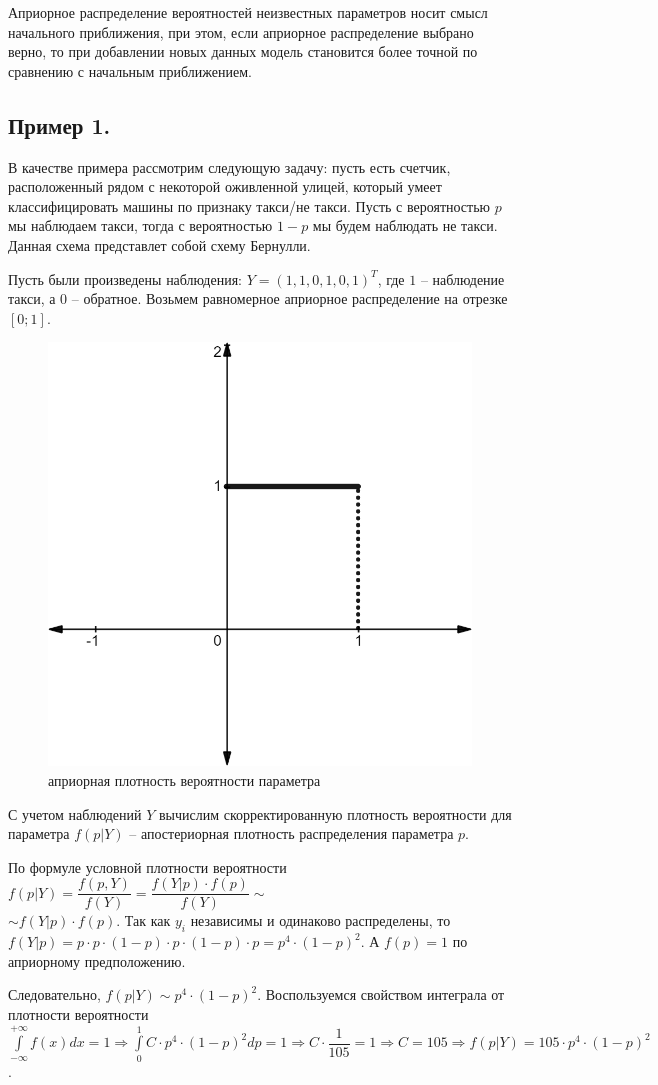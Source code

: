 \documentclass[a4paper,12pt]{article}
\begin{document}
Априорное распределение вероятностей неизвестных параметров носит смысл начального приближения, при этом, если априорное распределение выбрано верно, то при добавлении новых данных модель становится более точной по сравнению с начальным приближением.

\subsection*{Пример 1.\\}
В качестве примера рассмотрим следующую задачу: пусть есть счетчик, расположенный рядом с некоторой оживленной улицей, который умеет классифицировать машины по признаку такси/не такси. Пусть с вероятностью $p$ мы наблюдаем такси, тогда с вероятностью $1-p$ мы будем наблюдать не такси. Данная схема представлет собой схему Бернулли.

Пусть были произведены наблюдения: $Y = (1, 1, 0, 1, 0, 1)^T$, где $1$ -- наблюдение такси, а $0$ -- обратное. Возьмем равномерное априорное распределение на отрезке $[0;1]$.

\begin{figure}[H]
    \centering
    \includegraphics[width=0.3\linewidth]{src/img/априорное_респределение_1.png}
    \caption{априорная плотность вероятности параметра}
\end{figure}

С учетом наблюдений $Y$ вычислим скорректированную плотность вероятности для параметра $f(p|Y)$ -- апостериорная плотность распределения параметра $p$.

По формуле условной плотности вероятности $f(p|Y) = \dfrac{f(p,Y)}{f(Y)} = \dfrac{f(Y|p) \cdot f(p)}{f(Y)} \sim$\\
$\sim f(Y|p) \cdot f(p)$. Так как $y_i$ независимы и одинаково распределены, то $f(Y|p) = p \cdot p \cdot (1 - p) \cdot p \cdot (1-p) \cdot p = p^4 \cdot (1 - p)^2$. А $f(p) = 1$ по априорному предположению.

Следовательно, $f(p|Y) \sim p^4 \cdot (1 - p)^2$. Воспользуемся свойством интеграла от плотности вероятности $\int\limits_{-\infty}^{+\infty} f(x) dx = 1 \Longrightarrow \int\limits_{0}^{1} C \cdot p^4 \cdot (1 - p)^2 dp = 1 \Longrightarrow C \cdot \dfrac{1}{105} = 1 \Longrightarrow C = 105 \Longrightarrow f(p|Y) = 105 \cdot p^4 \cdot (1 - p)^2$.
\end{document}
